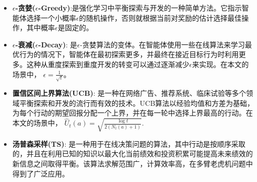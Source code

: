 \begin{itemize}
	\item \textbf{$\epsilon$-贪婪($\epsilon$-Greedy)}:是强化学习中平衡探索与开发的一种简单方法。它指示智能体选择一个小概率$\epsilon$的随机操作，否则就根据当前对奖励的估计选择最佳操作，其中概率$\epsilon$是固定的。

	\item \textbf{$\epsilon$-衰减($\epsilon$-Decay)}: 是$\epsilon$-贪婪算法的变体。在智能体使用一些在线算法来学习最优行为的情况下，智能体在最初探索更多，并最终在接近目标行为时利用更多。这种从重度探索到重度开发的转变可以通过逐渐减少$\epsilon$来实现。在本文的场景中，	$\epsilon = \frac{1}{\sqrt{t}}$。
	
	\item \textbf{置信区间上界算法(UCB)}: 是一种在网络广告、推荐系统、临床试验等多个领域平衡探索和开发的流行而有效的技术。UCB算法以经验均值和方差为基础，为每个行动的期望回报分配一个上界，并在每一轮中选择上界最高的行动。在本文的场景中， $\hat{U}_{t}(a) = \sqrt{\frac{\log t}{2(N_{t}(a)+1)}}$.
	
	\item \textbf{汤普森采样(TS)}: 是一种用于在线决策问题的算法，其中行动是按顺序采取的，并且在利用已知的知识以最大化当前绩效和投资积累可能提高未来绩效的新信息之间取得平衡。该算法求解范围广，计算效率高，在多臂老虎机问题中得到了广泛应用。
\end{itemize}

